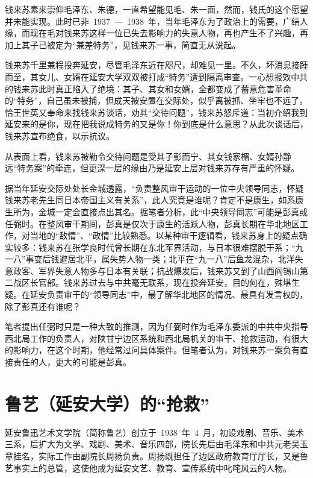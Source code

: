 钱来苏素来崇仰毛泽东、朱德，一直希望能见毛、朱一面，然而，钱氏的这个愿望并未能实现。此时已非~1937~—~1938~年，当年毛泽东为了政治上的需要，广结人缘，而现在毛对钱来苏这样一位已失去影响力的失意人物，再也产生不了兴趣，再加上其子已被定为“兼差特务”，见钱来苏一事，简直无从说起。

钱来苏千里兼程投奔延安，尽管毛泽东近在咫尺，却难见一里。不久，坏消息接踵而至，其女儿、女婿在延安大学双双被打成“特务”遭到隔离审查。一心想报效中共的钱来苏此时真正陷入了绝境：其子、其女和女婿，全都变成了蓄意危害革命的“特务”，自己虽未被捕，但成天被安置在交际处，似乎离被抓、坐牢也不远了。恰王世英又奉命来找钱来苏谈话，劝其“交待问题”，钱来苏怒斥道：当初介绍我到延安来的是你，现在把我说成特务的又是你！你到底是什么意思？从此次谈话后，钱来苏宣布绝食，以示抗议。

从表面上看，钱来苏被勒令交待问题是受其子彭而宁、其女钱家楣、女婿孙静远“特务案”的牵连，但更深一层的缘由乃是延安上层对钱来苏存有严重的怀疑。

据当年延安交际处处长金城透露，“负责整风审干运动的一位中央领导同志，怀疑钱来苏老先生同日本帝国主义有关系”，此人究竟是谁呢？肯定不是康生，如系康生所为，金城一定会直接点出其名。据笔者分析，此“中央领导同志”可能是彭真或任弼时。在整风审干期间，彭真是仅次于康生的活跃人物，彭真长期在华北地区工作，对当地的“敌情”、“政情”比较熟悉。以某种审干逻辑看，钱来苏身上的疑点确实较多：钱来苏在张学良时代曾长期在东北军界活动，与日本很难摆脱干系；“九一八”事变后钱避居北平，属失势人物一类；北平在“九一八”后鱼龙混杂，北洋失意政客、军界失意人物多与日本有关联；抗战爆发后，钱来苏又到了山西阎锡山第二战区长官部。钱来苏过去与中共毫无联系，现在投奔延安，目的何在，殊堪生疑。在延安负责审干的“领导同志”中，最了解华北地区的情况、最具有发言权的，除了彭真还有谁呢？

笔者提出任弼时只是一种大致的推测，因为任弼时作为毛泽东委派的中共中央指导西北局工作的负责人，对陕甘宁边区系统和西北局机关的审干、抢救运动，有很大的影响力，在这个时期，他经常过问具体案件。但笔者认为，对钱来苏一案负有直接责任的人，更大的可能是彭真。

\section{鲁艺（延安大学）的“抢救”}

延安鲁迅艺术文学院（简称鲁艺）创立于~1938~年~4~月，初设戏剧、音乐、美术三系，后扩大为文学、戏剧、美术、音乐四部，院长先后由毛泽东和中共元老吴玉章挂名，实际工作由副院长周扬负责。周扬既担任了边区政府教育厅厅长，又是鲁艺事实上的总管，这使他成为延安文艺、教育、宣传系统中叱咤风云的人物。

